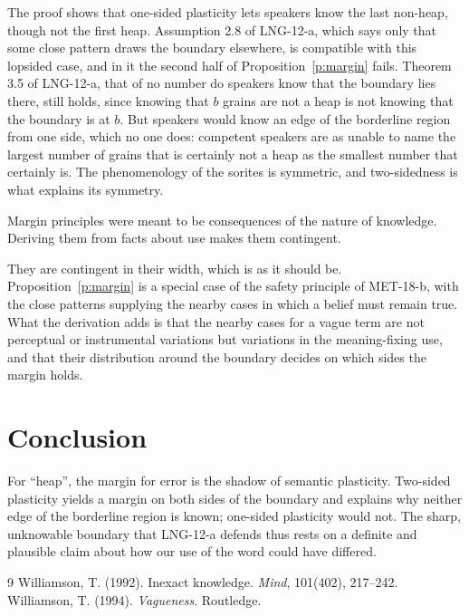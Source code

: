 \documentclass{situationist-preprint}
\begin{document}
The proof shows that one-sided plasticity lets speakers know the last non-heap, though not the first heap. Assumption 2.8 of LNG-12-a, which says only that some close pattern draws the boundary elsewhere, is compatible with this lopsided case, and in it the second half of Proposition~\ref{p:margin} fails. Theorem 3.5 of LNG-12-a, that of no number do speakers know that the boundary lies there, still holds, since knowing that $b$ grains are not a heap is not knowing that the boundary is at $b$. But speakers would know an edge of the borderline region from one side, which no one does: competent speakers are as unable to name the largest number of grains that is certainly not a heap as the smallest number that certainly is. The phenomenology of the sorites is symmetric, and two-sidedness is what explains its symmetry.

\begin{objection}
Margin principles were meant to be consequences of the nature of knowledge. Deriving them from facts about use makes them contingent.
\end{objection}

\begin{reply}
They are contingent in their width, which is as it should be. Proposition~\ref{p:margin} is a special case of the safety principle of MET-18-b, with the close patterns supplying the nearby cases in which a belief must remain true. What the derivation adds is that the nearby cases for a vague term are not perceptual or instrumental variations but variations in the meaning-fixing use, and that their distribution around the boundary decides on which sides the margin holds.
\end{reply}

\section{Conclusion}

For \enquote{heap}, the margin for error is the shadow of semantic plasticity. Two-sided plasticity yields a margin on both sides of the boundary and explains why neither edge of the borderline region is known; one-sided plasticity would not. The sharp, unknowable boundary that LNG-12-a defends thus rests on a definite and plausible claim about how our use of the word could have differed.

\begin{thebibliography}{9}\small
{} Williamson, T. (1992). Inexact knowledge. \emph{Mind}, 101(402), 217--242.
 Williamson, T. (1994). \emph{Vagueness}. Routledge.
\end{thebibliography}
\end{document}
